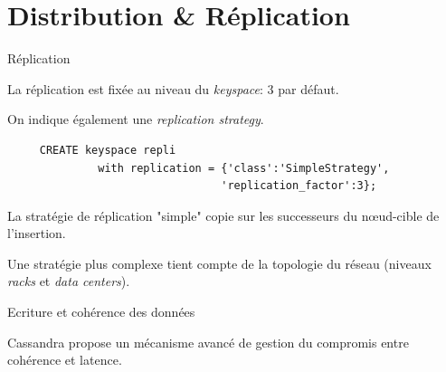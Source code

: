


\section{Distribution \& Réplication}

\begin{frame}[fragile]{Réplication}

La réplication est fixée au niveau du \textit{keyspace}: 3 par défaut.
	
\vfill

On indique également une \textit{replication strategy}.

\begin{verbatim}
     CREATE keyspace repli 
              with replication = {'class':'SimpleStrategy', 
                                 'replication_factor':3};
\end{verbatim}

\vfill

La stratégie de réplication "simple" copie sur les successeurs du nœud-cible de l'insertion.

\vfill

Une stratégie plus complexe tient compte de la topologie du réseau (niveaux \textit{racks}
et \textit{data centers}). 

\end{frame}


\begin{frame}[fragile]{Ecriture et cohérence des données}

Cassandra propose un mécanisme avancé de gestion du compromis entre cohérence et latence. 


\vfill




\end{frame}

